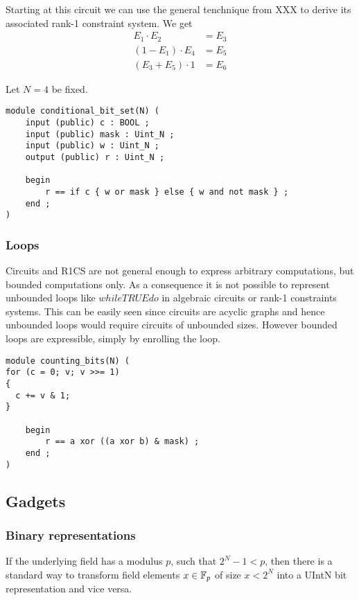 Starting at this circuit we can use the general tenchnique from XXX to derive its associated rank-1 constraint system. We get
\begin{align*}
E_1 \cdot E_2 & = E_3 \\
(1 - E_1) \cdot E_4 & = E_5 \\
(E_3 + E_5)\cdot 1 &= E_6
\end{align*}
\begin{example} Let $N=4$ be fixed.
\begin{lstlisting}
module conditional_bit_set(N) (
	input (public) c : BOOL ;
	input (public) mask : Uint_N ;
	input (public) w : Uint_N ;
	output (public) r : Uint_N ;

	begin
		r == if c { w or mask } else { w and not mask } ;
	end ;
)
\end{lstlisting}
\end{example}


\subsubsection{Loops} Circuits and R1CS are not general enough to express arbitrary computations, but bounded computations only. As a consequence it is not possible to represent unbounded loops like $while TRUE do {}$ in algebraic circuits or rank-1 constraints systems. This can be easily seen since circuits are acyclic graphs and hence unbounded loops would require circuits of unbounded sizes. However bounded loops are expressible, simply by enrolling the loop. 

\begin{example}
\begin{lstlisting}
module counting_bits(N) (
for (c = 0; v; v >>= 1)
{
  c += v & 1;
}

	begin
		r == a xor ((a xor b) & mask) ;
	end ;
)
\end{lstlisting}
\end{example}

\subsection{Gadgets}
\subsubsection{Binary representations}
If the underlying field has a modulus $p$, such that $2^N-1 < p$, then there is a standard way to transform field elements $x\in \mathbb{F}_p$ of size $x<2^N$ into a UIntN bit representation and vice versa.

